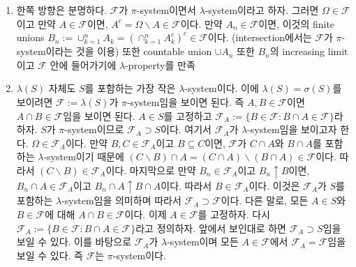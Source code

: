 \documentclass[
  letterpaper,
  DIV=11,
  numbers=noendperiod]{scrreprt}
\theoremstyle{definition}
\theoremstyle{plain}
\theoremstyle{plain}
\theoremstyle{definition}
\theoremstyle{plain}
\theoremstyle{definition}
\theoremstyle{remark}
\begin{document}
\begin{tcolorbox}[enhanced jigsaw, left=2mm, arc=.35mm, leftrule=.75mm, colback=white, title=\textcolor{quarto-callout-note-color}{\faInfo}\hspace{0.5em}{Proof}, rightrule=.15mm, breakable, bottomrule=.15mm, coltitle=black, opacitybacktitle=0.6, opacityback=0, toptitle=1mm, titlerule=0mm, toprule=.15mm, colbacktitle=quarto-callout-note-color!10!white, bottomtitle=1mm, colframe=quarto-callout-note-color-frame]

\begin{enumerate}
\def\labelenumi{\arabic{enumi}.}
\item
  한쪽 방향은 분명하다. \(\mathcal{F}\)가 \(\pi\)-system이면서
  \(\lambda\)-system이라고 하자. 그러면 \(\Omega \in \mathcal{F}\)이고
  만약 \(A\in \mathcal{F}\)이면,
  \(A^c = \Omega \backslash A \in \mathcal{F}\)이다. 만약
  \(A_n \in \mathcal{F}\)이면, 이것의 finite unions
  \(B_n := \cup_{k=1}^n A_k = (\cap_{k=1}^n A_k^c)^c \in \mathcal{F}\)이다.
  (intersection에서는 \(\mathcal{F}\)가 \(\pi\)-system이라는 것을 이용)
  또한 countable union \(\cup A_n\) 또한 \(B_n\)의 increasing limit이고
  \(\mathcal{F}\) 안에 들어가기에 \(\lambda\)-property를 만족
\item
  \(\lambda (S)\) 자체도 \(S\)를 포함하는 가장 작은
  \(\lambda\)-system이다. 이에 \(\lambda (S) = \sigma (S)\)를 보이려면
  \(\mathcal{F}:=\lambda (S)\)가 \(\pi\)-system임을 보이면 된다. 즉
  \(A, B \in \mathcal{F}\)이면 \(A\cap B \in \mathcal{F}\)임을 보이면
  된다. \(A\in S\)를 고정하고
  \(\mathcal{F}_A := \{ B \in \mathcal{F}: B \cap A \in \mathcal{F}\}\)라
  하자. \(S\)가 \(\pi\)-system이므로 \(\mathcal{F}_A \supset S\)이다.
  여기서 \(\mathcal{F}_A\)가 \(\lambda\)-system임을 보이고자 한다.
  \(\Omega \in \mathcal{F}_A\)이다. 만약 \(B, C \in \mathcal{F}_A\)이고
  \(B\subseteq C\)이면, \(\mathcal{F}\)가 \(C\cap A\)와 \(B\cap A\)를
  포함하는 \(\lambda\)-system이기 때문에
  \((C\backslash B) \cap A = (C \cap A) \backslash (B \cap A) \in \mathcal{F}\)이다.
  따라서 \((C\backslash B) \in \mathcal{F}_A\)이다. 마지막으로 만약
  \(B_n \in \mathcal{F}_A\)이고 \(B_n \uparrow B\)이면,
  \(B_n \cap A \in \mathcal{F}_A\)이고
  \(B_n \cap A \uparrow B \cap A\)이다. 따라서
  \(B \in \mathcal{F}_A\)이다. 이것은 \(\mathcal{F}_A\)가 \(S\)를
  포함하는 \(\lambda\)-system임을 의미하며 따라서
  \(\mathcal{F}_A \supset \mathcal{F}\)이다. 다른 말로, 모든
  \(A \in S\)와 \(B \in \mathcal{F}\)에 대해
  \(A \cap B \in \mathcal{F}\)이다. 이제 \(A\in\mathcal{F}\)를 고정하자.
  다시
  \(\mathcal{F}_A := \{ B\in \mathcal{F}: B\cap A \in \mathcal{F}\}\)라고
  정의하자. 앞에서 보인대로 하면 \(\mathcal{F}_A \supset S\)임을 보일 수
  있다. 이를 바탕으로 \(\mathcal{F}_A\)가 \(\lambda\)-system이며 모든
  \(A \in \mathcal{F}\)에서 \(\mathcal{F}_A = \mathcal{F}\)임을 보일 수
  있다. 즉 \(\mathcal{F}\)는 \(\pi\)-system이다.
\end{enumerate}

\end{tcolorbox}
\end{document}
